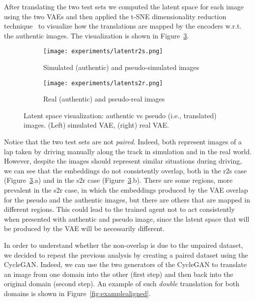 After translating the two test sets we computed the latent space for each image using the two VAEs and then applied the t-SNE dimensionality reduction technique~\cite{tsne} to visualize how the translations are mapped by the encoders w.r.t. the authentic images. The visualization is shown in Figure~\ref{fig:latentpseudo}.

\begin{figure}[h]
  \centering
  \begin{subfigure}{.5\linewidth}
	      \centering
	      \texttt{[image: experiments/latentr2s.png]}
	      \caption{Simulated (authentic) and pseudo-simulated images}\label{fig:latentr2s}
	  \end{subfigure}%
      \hfill
  \begin{subfigure}{.5\linewidth}
	      \centering
	      \texttt{[image: experiments/latents2r.png]}
	      \caption{Real (authentic) and pseudo-real images}\label{fig:latents2r}
	  \end{subfigure}
  \caption{Latent space visualization: authentic vs pseudo (i.e., translated) images. (Left) simulated VAE, (right) real VAE.}
  \label{fig:latentpseudo}
\end{figure}

Notice that the two test sets are not \textit{paired}. Indeed, both represent images of a lap taken by driving manually along the track in simulation and in the real world. However, despite the images should represent similar situations during driving, we can see that the embeddings do not consistently overlap, both in the r2s case (Figure~\ref{fig:latentpseudo}.a) and in the s2r case (Figure~\ref{fig:latentpseudo}.b). There are some regions, more prevalent in the s2r case, in which the embeddings produced by the VAE overlap for the pseudo and the authentic images, but there are others that are mapped in different regions. This could lead to the trained agent not to act consistently when presented with authentic and pseudo image, since the latent space that will be produced by the VAE will be necessarily different.

In order to understand whether the non-overlap is due to the unpaired dataset, we decided to repeat the previous analysis by creating a paired dataset using the CycleGAN. Indeed, we can use the two generators of the CycleGAN to translate an image from one domain into the other (first step) and then back into the original domain (second step). An example of such \textit{double} translation for both domains is shown in Figure~\ref{fig:examplealigned}.

